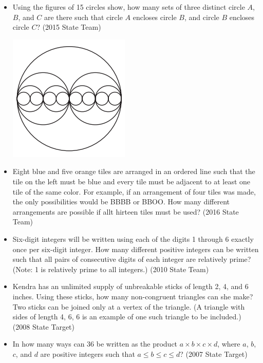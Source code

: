 \documentclass{article}
\begin{document}
\begin{itemize}

\item Using the figures of 15 circles show, how many sets of three distinct circle $A$, $B$, and $C$ are there such that circle $A$ encloses circle $B$, and circle $B$ encloses circle $C$? (2015 State Team)

\centerline{\includegraphics{20152.png}}

\item Eight blue and five orange tiles are arranged in an ordered line such that the tile on the left must be blue and every tile must be adjacent to at least one tile of the same color. For example, if an arrangement of four tiles was made, the only possibilities would be BBBB or BBOO. How many different arrangements are possible if allt hirteen tiles must be used? (2016 State Team)

\item Six-digit integers will be written using each of the digits 1 through 6 exactly once per six-digit integer. How many different positive integers can be written such that all pairs of consecutive digits of each integer are relatively prime? (Note: 1 is relatively prime to all integers.) (2010 State Team) 

\item Kendra has an unlimited supply of unbreakable sticks of length 2, 4, and 6 inches. Using these sticks, how many non-congruent triangles can she make? Two sticks can be joined only at a vertex of the triangle. (A triangle with sides of length 4, 6, 6 is an example of one such triangle to be included.) (2008 State Target)

\item In how many ways can 36 be written as the product $a\times b\times c\times d$, where $a$, $b$, $c$, and $d$ are positive integers such that $a\le b\le c\le d$? (2007 State Target)


\end{itemize}
\end{document}
